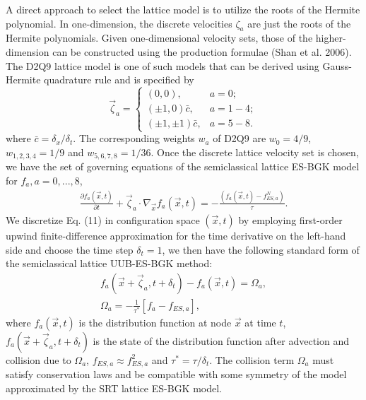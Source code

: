 \documentclass[doublecol]{epl2}
\begin{document}
A direct approach to select the lattice model is to utilize the roots of the Hermite polynomial. In one-dimension, the discrete velocities $\zeta_a$ are just the roots of the Hermite polynomials.  Given one-dimensional velocity sets, those of the higher-dimension can be constructed using the production formulae (Shan et al. 2006).  The D2Q9 lattice model is one of such models that can be derived using Gauss-Hermite quadrature rule and is specified by
\begin{equation}
\vec \zeta_a =
  \begin{cases}
   (0, 0), & a =0; \\
   (\pm 1, 0) \bar{c}, &  a=1-4; \\
   (\pm 1, \pm 1) \bar{c}, & a=5-8.
  \end{cases}
\end{equation}
where $\bar{c} = \delta_x/\delta_t$. The corresponding weights $w_a$ of D2Q9 are $w_0=4/9$, $w_{1,2,3,4}=1/9$ and $w_{5,6,7,8}=1/36$.
Once the discrete lattice velocity set is chosen, we have the set of governing equations of the semiclassical lattice ES-BGK model for $f_a, a=0, ..., 8$,
\begin{align}
\frac{\partial f_a (\vec x, t)}{\partial t} + \vec \zeta_a \cdot
\nabla_{\vec x} f_a( \vec x, t) =  -\frac{(f_a(\vec x, t) - f^{N}_{ES,a})}{\tau}.
\end{align}
We discretize Eq. (11) in configuration space $(\vec x,t)$ by employing first-order upwind finite-difference approximation for
the time derivative on the left-hand side and choose the time step $\delta_t = 1$, we then have the following standard form of the
semiclassical lattice UUB-ES-BGK method:
\begin{align}
f_a(\vec x+ \vec \zeta_a, t+\delta_t)- f_a(\vec x,t)=\Omega_a,\nonumber \\
\Omega_a = -\frac{1}{\tau^*}[f_a - f_{ES,a}],
\end{align}
where $f_a(\vec x,t)$ is the distribution function at node $\vec x$ at time $t$, $f_a(\vec x+ \vec \zeta_a, t+\delta_t)$ is the state of the distribution function after advection and collision due to $\Omega_a$, $f_{ES,a} \approx f_{ES,a}^{2}$ and $\tau^*= \tau/\delta_t$.  The collision term $\Omega_a$ must satisfy conservation laws and be compatible with some symmetry of the model approximated by the SRT lattice ES-BGK model.
\end{document}

